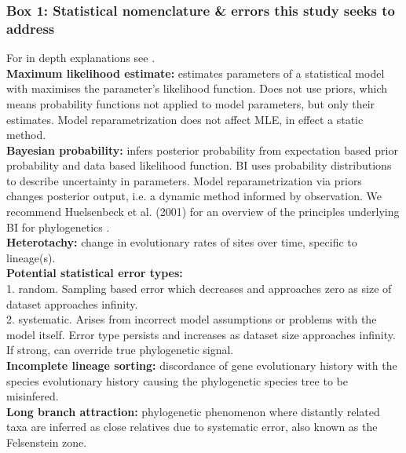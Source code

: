 \documentclass[12pt]{article}
\begin{document}
\subsubsection*{Box 1: Statistical nomenclature \& errors this study seeks to address}
For in depth explanations see \cite{yang2014molecular}.\\
\textbf{Maximum likelihood estimate:} estimates parameters of a statistical model with maximises the parameter's likelihood function. 
Does not use priors, which means probability functions not applied to model parameters, but only their estimates. 
Model reparametrization does not affect MLE, in effect a static method.\\
\textbf{Bayesian probability:} infers posterior probability from expectation based prior probability and data based likelihood function.
BI uses probability distributions to describe uncertainty in parameters.
Model reparametrization via priors changes posterior output, i.e. a dynamic method informed by observation. 
We recommend Huelsenbeck et al. (2001) for an overview of the principles underlying BI for phylogenetics \cite{huelsenbeck2001bayesian}.\\
\textbf{Heterotachy:} change in evolutionary rates of sites over time, specific to lineage(s).\\
\textbf{Potential statistical error types:}\\
1. random. Sampling based error which decreases and approaches zero as size of dataset approaches infinity.\\
2. systematic. Arises from incorrect model assumptions or problems with the model itself. 
Error type persists and increases as dataset size approaches infinity. 
If strong, can override true phylogenetic signal.\\
\textbf{Incomplete lineage sorting:} discordance of gene evolutionary history with the species evolutionary history causing the phylogenetic species tree to be misinfered.\\
\textbf{Long branch attraction:} phylogenetic phenomenon where distantly related taxa are inferred as close relatives due to systematic error, also known as the Felsenstein zone.
\end{document}
